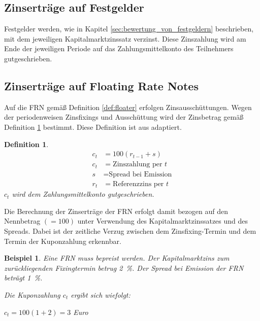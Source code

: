 \documentclass[12pt, a4paper]{article}
\theoremstyle{plain}
\newtheorem{definition}{Definition}
\newtheorem{example}{Beispiel}
\begin{document}
\subsection{Zinserträge auf Festgelder}
\label{sec:zinsertraege_auf_festgelder}
Festgelder werden, wie in Kapitel \ref{sec:bewertung_von_festgeldern} beschrieben, mit dem jeweiligen Kapitalmarktzinssatz verzinst. Diese Zinszahlung wird am Ende der jeweiligen Periode auf das Zahlungsmittelkonto des Teilnehmers gutgeschrieben.

\subsection{Zinserträge auf Floating Rate Notes}
\label{sec:zinsertraege_auf_floating_rate_notes}

Auf die \gls{FRN} gemäß Definition \ref{def:floater} erfolgen Zinsausschüttungen.
Wegen der periodenweisen Zinsfixings und Ausschüttung wird der Zinsbetrag gemäß Definition \ref{def:zins_floater} bestimmt.
Diese Definition ist aus \textcite[][S.~52]{veronesi_fixed_2010} adaptiert.

\begin{definition}
	\label{def:zins_floater}
\begin{align*}
	c_t &= 100 (r_{t-1} + s)\\
	c_t &= \text{Zinszahlung per $t$}\\
	s &= \text{Spread bei Emission}\\
	r_t &= \text{Referenzzins per $t$}
\end{align*}
$c_t$ wird dem Zahlungsmittelkonto gutgeschrieben.
\end{definition}

Die Berechnung der Zinserträge der \gls{FRN} erfolgt damit bezogen auf den Nennbetrag $(= 100)$ unter Verwendung des Kapitalmarktzinssatzes und des Spreads. Dabei ist der zeitliche Verzug zwischen dem Zinsfixing-Termin und dem Termin der Kuponzahlung erkennbar.

\begin{example}
	Eine \gls{FRN} muss bepreist werden. Der Kapitalmarktzins zum zurückliegenden Fixingtermin betrug 2~\%. Der \textit{Spread} bei Emission der \gls{FRN} beträgt 1~\%. 
	
	Die Kuponzahlung $c_t$ ergibt sich wiefolgt:

	$c_t= 100 (1 + 2) = 3 $ Euro
\end{example}
\clearpage
\printbibliography[title={Literatur}]
\end{document}
